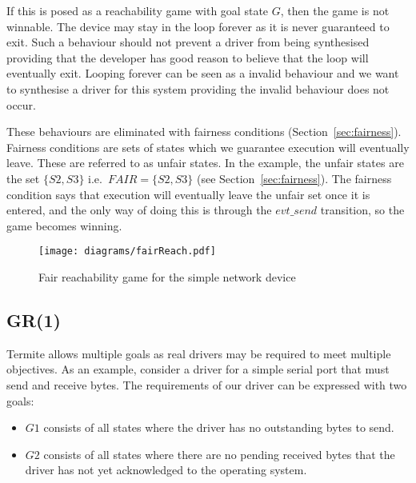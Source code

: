 If this is posed as a reachability game with goal state $G$, then the game is not winnable. The device may stay in the loop forever as it is never guaranteed to exit. Such a behaviour should not prevent a driver from being synthesised providing that the developer has good reason to believe that the loop will eventually exit. Looping forever can be seen as a invalid behaviour and we want to synthesise a driver for this system providing the invalid behaviour does not occur. 

These behaviours are eliminated with fairness conditions (Section~\ref{sec:fairness}). Fairness conditions are sets of states which we guarantee execution will eventually leave. These are referred to as unfair states. In the example, the unfair states are the set $\{S2, S3\}$ i.e.\ $FAIR=\{S2, S3\}$ (see Section~\ref{sec:fairness}). The fairness condition says that execution will eventually leave the unfair set once it is entered, and the only way of doing this is through the $evt\_send$ transition, so the game becomes winning.

\begin{figure}[t]
\centering
\texttt{[image: diagrams/fairReach.pdf]}
\caption{Fair reachability game for the simple network device}
\label{fig:fair}
\end{figure}

\subsection{GR(1)}
\label{sec:games_gr1}

Termite allows multiple goals as real drivers may be required to meet multiple objectives. As an example, consider a driver for a simple serial port that must send and receive bytes. The requirements of our driver can be expressed with two goals: 

\begin{itemize}
    \item $G1$ consists of all states where the driver has no outstanding bytes to send.
    \item $G2$ consists of all states where there are no pending received bytes that the driver has not yet acknowledged to the operating system. 
\end{itemize}

